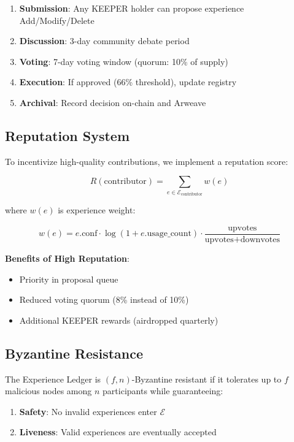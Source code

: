 \begin{enumerate}
    \item \textbf{Submission}: Any KEEPER holder can propose experience Add/Modify/Delete
    \item \textbf{Discussion}: 3-day community debate period
    \item \textbf{Voting}: 7-day voting window (quorum: 10\% of supply)
    \item \textbf{Execution}: If approved (66\% threshold), update registry
    \item \textbf{Archival}: Record decision on-chain and Arweave
\end{enumerate}

\subsection{Reputation System}

To incentivize high-quality contributions, we implement a reputation score:

\begin{equation}
R(\text{contributor}) = \sum_{e \in \mathcal{E}_{\text{contributor}}} w(e)
\end{equation}

where $w(e)$ is experience weight:

\begin{equation}
w(e) = e.\text{conf} \cdot \log(1 + e.\text{usage\_count}) \cdot \frac{\text{upvotes}}{\text{upvotes} + \text{downvotes}}
\end{equation}

\textbf{Benefits of High Reputation}:
\begin{itemize}
    \item Priority in proposal queue
    \item Reduced voting quorum (8\% instead of 10\%)
    \item Additional KEEPER rewards (airdropped quarterly)
\end{itemize}

\subsection{Byzantine Resistance}

\begin{definition}
The Experience Ledger is $(f, n)$-Byzantine resistant if it tolerates up to $f$ malicious nodes among $n$ participants while guaranteeing:
\begin{enumerate}
    \item \textbf{Safety}: No invalid experiences enter $\mathcal{E}$
    \item \textbf{Liveness}: Valid experiences are eventually accepted
\end{enumerate}
\end{definition}

